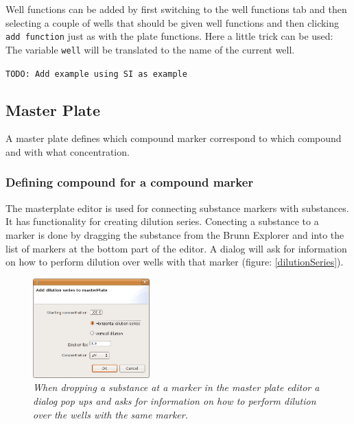 \documentclass[a4paper,10pt]{article}
\begin{document}
                Well functions can be added by first switching to the well
                functions tab and then selecting a couple of wells that should
                be given well functions and then clicking \texttt{add function}
                just as with the plate functions. Here a little trick can be
                used: The variable \texttt{well} will be translated to the name
                of the current well. 

                \texttt{TODO: Add example using SI as example}
        \subsection{Master Plate}
            A master plate defines which compound marker correspond to which
            compound and with what concentration.
            
            \subsubsection{Defining compound for a compound marker}
                The masterplate editor is used for connecting substance markers
                with substances. It has functionality for creating dilution
                series. Conecting a substance to a marker is done by dragging
                the substance from the Brunn Explorer and into the list of
                markers at the bottom part of the editor. A dialog will 
                ask for information on how to perform dilution over wells with
                that marker (figure: \ref{dilutionSeries}).

                \begin{figure}[htbp]
                    \begin{center}
                        \includegraphics[width=0.4\textwidth]
                                        {images/dilutionSeries.png}
                    \end{center}
                    \caption{\textit{When dropping a substance at a marker in
                    the master plate editor a dialog pop ups and asks for
                    information on how to perform dilution over the wells with
                    the same marker.}}
                    \label{dilutionsSeries}
                \end{figure}
\end{document}
